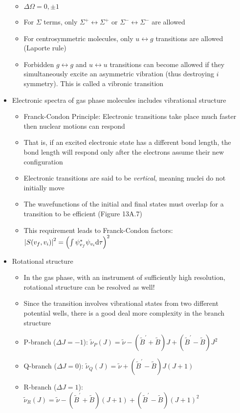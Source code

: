 \documentclass[12pt, openany, letterpaper]{memoir}
\begin{document}
\begin{itemize}
\begin{itemize}
		\item $\Delta \Omega = 0,\pm1$
		\item For $\Sigma$ terms, only $\Sigma^+\leftrightarrow\Sigma^+$ or $\Sigma^-\leftrightarrow\Sigma^-$ are allowed
		\item For centrosymmetric molecules, only $u\leftrightarrow g$ transitions are allowed (Laporte rule)
		\item Forbidden $g\leftrightarrow g$ and $u\leftrightarrow u$ transitions can become allowed if they simultaneously excite an asymmetric vibration (thus destroying $i$ symmetry). This is called a vibronic transition
	\end{itemize}
	\item Electronic spectra of gas phase molecules includes vibrational structure
	\begin{itemize}
		\item Franck-Condon Principle: Electronic transitions take place much faster then nuclear motions can respond
		\item That is, if an excited electronic state has a different bond length, the bond length will respond only after the electrons assume their new configuration
		\item Electronic transitions are said to be \emph{vertical}, meaning nuclei do not initially move
		\item The wavefunctions of the initial and final states must overlap for a transition to be efficient (Figure 13A.7)
		\item This requirement leads to Franck-Condon factors: $\left| S(v_f,v_i) \right|^2 = \left(\int\psi_{v_f}^*\psi_{v_i}\mathrm{d}\tau\right)^2$
	\end{itemize}
	\item Rotational structure
	\begin{itemize}
		\item In the gas phase, with an instrument of sufficiently high resolution, rotational structure can be resolved as well!
		\item Since the transition involves vibrational states from two different potential wells, there is a good deal more complexity in the branch structure
		\item P-branch ($\Delta J = -1$): $\tilde{\nu}_P(J) = \tilde{\nu}-\left(\tilde{B}^\prime + \tilde{B}\right)J + \left(\tilde{B}^\prime - \tilde{B}\right)J^2$
		\item Q-branch ($\Delta J = 0$): $\tilde{\nu}_Q(J) = \tilde{\nu} + \left(\tilde{B}^\prime - \tilde{B}\right)J(J+1)$
		\item R-branch ($\Delta J=1$):  $\tilde{\nu}_R(J) = \tilde{\nu}-\left(\tilde{B}^\prime + \tilde{B}\right)(J+1) + \left(\tilde{B}^\prime - \tilde{B}\right)(J+1)^2$

\end{itemize}
\end{itemize}
\end{document}
